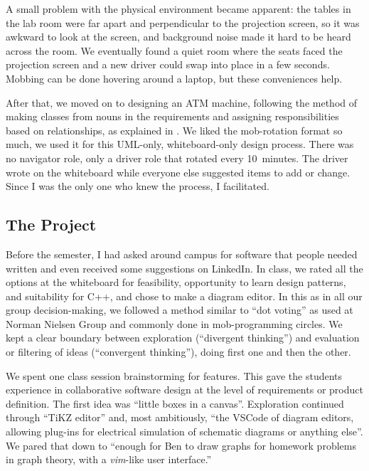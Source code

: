 \documentclass{article}
\begin{document}
A small problem with the physical environment became apparent: the tables in
the lab room were far apart and perpendicular to the projection screen, so it
was awkward to look at the screen, and background noise made it hard to be
heard across the room. We eventually found a quiet room where the seats faced
the projection screen and a new driver could swap into place in a few seconds.
Mobbing can be done hovering around a laptop, but these conveniences help.

After that, we moved on to designing an ATM machine,
following the method of
making classes from nouns in the requirements and assigning responsibilities
based on relationships, as explained in \cite{wirfs1990designing}. We liked
the mob-rotation format so much, we used it for this UML-only, whiteboard-only
design process. There was no navigator role, only a driver role that rotated
every 10~minutes. The driver wrote on the whiteboard while everyone else
suggested items to add or change. Since I was the only one who knew the
process, I facilitated.

\subsection{The Project}

Before the semester, I had asked around campus for software that people needed
written and even received some suggestions on LinkedIn. In class, we rated all
the options at the whiteboard for feasibility, opportunity to learn design
patterns, and suitability for C++, and chose to make a diagram editor. In this
as in all our group decision-making, we followed a method similar to ``dot
voting'' as used at Norman Nielsen Group \cite{budiu2024dotvoting} and
commonly done in mob-programming circles. We kept a clear boundary between
exploration (``divergent thinking'') and evaluation or filtering of ideas
(``convergent thinking''), doing first one and then the other.

We spent one class session brainstorming for features. This gave the
students experience in collaborative software design at the level of
requirements or product definition. The first idea was ``little boxes in a
canvas''. Exploration continued through ``TiKZ editor'' and, most ambitiously,
``the VSCode of diagram editors, allowing plug-ins for electrical simulation
of schematic diagrams or anything else''. We pared that down to ``enough for
Ben to draw graphs for homework problems in graph theory, with a
\emph{vim}-like user interface.''
\end{document}
